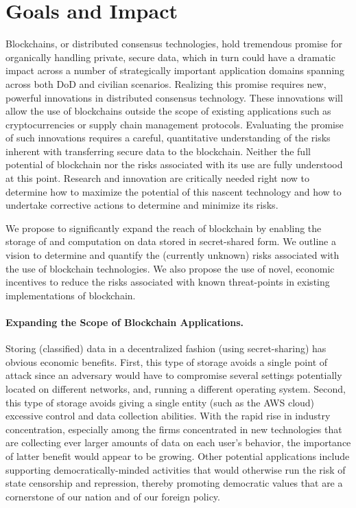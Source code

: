 \documentclass[runningheads, 12pt]{article}
\begin{document}


\vspace{-5pt}
\section{Goals and Impact}
\vspace{-4pt}

Blockchains, or distributed consensus technologies, hold tremendous promise for organically handling private, secure data, which in turn could have a dramatic impact across a number of strategically important application domains spanning across both DoD and civilian scenarios. Realizing this promise requires new, powerful innovations in distributed consensus technology. These innovations will allow the use of blockchains outside the scope of existing applications such as cryptocurrencies or supply chain management protocols. Evaluating the promise of such innovations requires a careful, quantitative understanding of the risks inherent with transferring secure data to the blockchain. Neither the full potential of blockchain nor the risks associated with its use are fully understood at this point. Research and innovation are critically needed right now to determine how to maximize the potential of this nascent technology and how to undertake corrective actions to determine and minimize its risks.

We propose to significantly expand the reach of blockchain by enabling the storage of and computation on data stored in secret-shared form. We outline a vision to determine and quantify the (currently unknown) risks associated with the use of blockchain technologies. We also propose the use of novel, economic incentives to reduce the risks associated with known threat-points in existing implementations of blockchain.

\vspace{-5pt}
\paragraph{Expanding the Scope of Blockchain Applications.} Storing (classified) data in a decentralized fashion (using secret-sharing) has obvious economic benefits. First, this type of storage avoids a single point of attack since an adversary would have to compromise several settings potentially located on different networks, and, running a different operating system. Second, this type of storage avoids giving a single entity (such as the AWS cloud) excessive control and data collection abilities. With the rapid rise in industry concentration, especially among the firms concentrated in new technologies that are collecting ever larger amounts of data on each user's behavior, the importance of latter benefit would appear to be growing. Other potential applications include supporting democratically-minded activities that would otherwise run the risk of state censorship and repression, thereby promoting democratic values that are a cornerstone of our nation and of our foreign policy.
\end{document}
